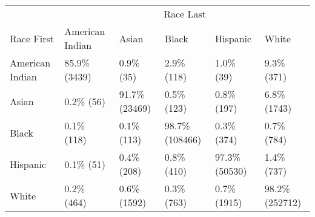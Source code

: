 \begin{table}[H]
\centering\begingroup\fontsize{9}{11}\selectfont

\begin{tabular}{llllll}
\toprule
\multicolumn{1}{c}{} & \multicolumn{5}{c}{Race Last} \\
\cmidrule(l{3pt}r{3pt}){2-6}
Race First & American Indian & Asian & Black & Hispanic & White\\
\midrule
American Indian & 85.9\% (3439) & 0.9\%    (35) & 2.9\%    (118) & 1.0\%    (39) & 9.3\%    (371)\\
Asian & 0.2\%   (56) & 91.7\% (23469) & 0.5\%    (123) & 0.8\%   (197) & 6.8\%   (1743)\\
Black & 0.1\%  (118) & 0.1\%   (113) & 98.7\% (108466) & 0.3\%   (374) & 0.7\%    (784)\\
Hispanic & 0.1\%   (51) & 0.4\%   (208) & 0.8\%    (410) & 97.3\% (50530) & 1.4\%    (737)\\
White & 0.2\%  (464) & 0.6\%  (1592) & 0.3\%    (763) & 0.7\%  (1915) & 98.2\% (252712)\\
\bottomrule
\end{tabular}
\endgroup{}
\end{table}
